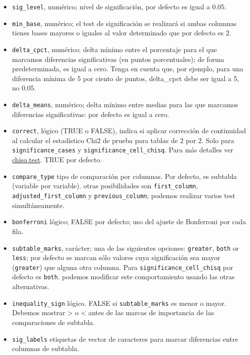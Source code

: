 \documentclass[
]{book}
\providecommand{\tightlist}{%
  \setlength{\itemsep}{0pt}\setlength{\parskip}{0pt}}
\begin{document}
\begin{itemize}
\tightlist
\item
  \texttt{sig\_level}, numérico; nivel de significación, por defecto es igual a 0.05.
\item
  \texttt{min\_base}, numérico; el test de significación se realizará si ambas columnas tienes bases mayores o iguales al valor determinado que por defecto es 2.
\item
  \texttt{delta\_cpct}, numérico; delta mínimo entre el porcentaje para el que marcamos diferencias significativas (en puntos porcentuales); de forma predeterminada, es igual a cero. Tenga en cuenta que, por ejemplo, para una diferencia mínima de 5 por ciento de puntos, delta\_cpct debe ser igual a 5, no 0.05.
\item
  \texttt{delta\_means}, numérico; delta mínimo entre medias para las que marcamos diferencias significativas: por defecto es igual a cero.
\item
  \texttt{correct}, lógico (TRUE o FALSE), indica si aplicar corrección de continuidad al calcular el estadístico Chi2 de prueba para tablas de 2 por 2. Solo para \texttt{significance\_cases} y \texttt{significance\_cell\_chisq}. Para más detalles ver \href{https://www.rdocumentation.org/packages/stats/versions/3.6.2/topics/chisq.test}{chisq.test}. TRUE por defecto.
\item
  \texttt{compare\_type} tipo de comparación por columnas. Por defecto, es subtabla (variable por variable). otras posibilidades son \texttt{first\_column}, \texttt{adjusted\_first\_column} y \texttt{previous\_column}; podemos realizar varios test simultáneamente.
\item
  \texttt{bonferroni} lógico; FALSE por defecto; uso del ajuste de Bonferroni por cada fila.
\item
  \texttt{subtable\_marks}, carácter; una de las siguientes opciones: \texttt{greater}, \texttt{both} or \texttt{less}; por defecto se marcan sólo valores cuya significación sea mayor (\texttt{greater}) que alguna otra columna. Para \texttt{significance\_cell\_chisq} por defecto es \texttt{both}. podemos modificar este comportamiento usando las otras alternativas.
\item
  \texttt{inequality\_sign} lógico. FALSE si \texttt{subtable\_marks} es menor o mayor. Debemos mostrar \textgreater{} o \textless{} antes de las marcas de importancia de las comparaciones de subtabla.
\item
  \texttt{sig\_labels} etiquetas de vector de caracteres para marcar diferencias entre columnas de subtabla.

\end{itemize}
\end{document}
